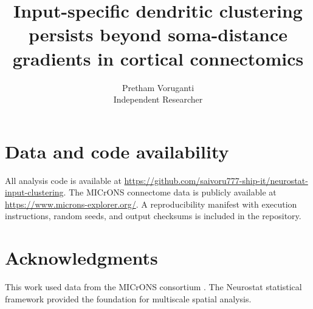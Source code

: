 \documentclass[11pt]{article}
\title{Input-specific dendritic clustering persists beyond soma-distance gradients in cortical connectomics}
\author{Pretham Voruganti\\
\small Independent Researcher}
\date{}
\begin{document}
\maketitle













\section*{Data and code availability}
All analysis code is available at \url{https://github.com/saivoru777-ship-it/neurostat-input-clustering}. The MICrONS connectome data is publicly available at \url{https://www.microns-explorer.org/}. A reproducibility manifest with execution instructions, random seeds, and output checksums is included in the repository.

\section*{Acknowledgments}
This work used data from the MICrONS consortium \citep{microns2025}. The Neurostat statistical framework \citep{neurostat} provided the foundation for multiscale spatial analysis.


\end{document}

